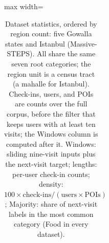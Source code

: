 \begin{table}[htbp]
\caption{Dataset statistics, ordered by region count: five Gowalla states and Istanbul
(Massive-STEPS). All share the same seven root categories; the region unit is a census
tract (a mahalle for Istanbul). Check-ins, users, and POIs are counts over the full corpus,
before the filter that keeps users with at least ten visits; the Windows column is computed
after it. Windows: sliding nine-visit inputs plus the next-visit
target; lengths: per-user check-in counts; density: $100\times\text{check-ins}/(\text{users}\times\text{POIs})$; Majority: share of next-visit
labels in the most common category (Food in every dataset).}
\label{tab:mobiwac:datasets}
\centering
\setlength{\tabcolsep}{3pt}
\begin{adjustbox}{max width=\textwidth}
\begin{tabular}{l l r r r r r r r r r}

\end{tabular}
\end{adjustbox}
\end{table}
